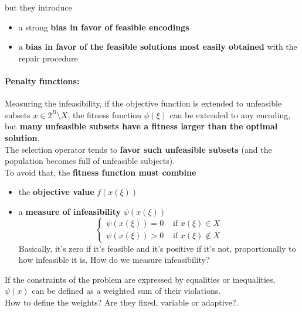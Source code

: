 \documentclass[11pt]{article}
\begin{document}
	but they introduce
	\begin{itemize}
		\item a strong \textbf{bias in favor of feasible encodings}
		\item a \textbf{bias in favor of the feasible solutions most easily obtained} with the repair procedure
	\end{itemize}
	
	\newpage
	
	\paragraph{Penalty functions:} Measuring the infeasibility, if the objective function is extended to unfeasible subsets $x \in 2^B \setminus X$, the fitness function $\phi (\xi)$ can be extended to any encoding, but \textbf{many unfeasible subsets have a fitness larger than the optimal solution}.\\
	
	The selection operator tends to \textbf{favor such unfeasible subsets} (and the population becomes full of unfeasible subjects).\\
	
	To avoid that, the \textbf{fitness function must combine}
	\begin{itemize}
		\item the \textbf{objective value} $f (x (\xi))$
		\item a \textbf{measure of infeasibility} $\psi (x (\xi))$
		$$\begin{cases}
			\psi (x (\xi)) = 0 & \text{ if } x (\xi) \in X \\
			\psi (x (\xi)) > 0 & \text{ if } x (\xi) \notin X
		\end{cases}$$
		Basically, it's zero if it's feasible and it's positive if it's not, proportionally to how infeasible it is. How do we measure infeasibility?
	\end{itemize}
	
	If the constraints of the problem are expressed by equalities or inequalities, $\psi (x)$ can be defined as a weighted sum of their violations.\\
	How to define the weights? Are they fixed, variable or adaptive?.\\
	
	\newpage
	
\end{document}
